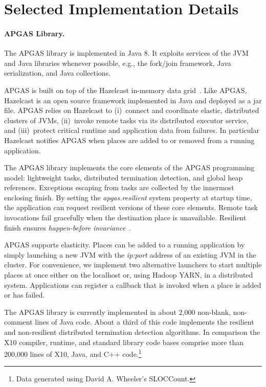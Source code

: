 \section{Selected Implementation Details}
\label{sec:serialization}

\paragraph{APGAS Library.}
The APGAS library is implemented in Java 8. It exploits services of the JVM and Java libraries whenever possible, e.g., the fork/join framework, Java serialization, and Java collections.

APGAS is built on top of the Hazelcast in-memory data grid~\cite{hazelcast}. Like APGAS, Hazelcast is an open source framework implemented in Java and deployed as a jar file. APGAS relies on Hazelcast to (i)~connect and coordinate elastic, distributed clusters of JVMs, (ii)~invoke remote tasks via its distributed executor service, and (iii)~protect critical runtime and application data from failures. In particular Hazelcast notifies APGAS when places are added to or removed from a running application.

The APGAS library implements the core elements of the APGAS programming model: lightweight tasks, distributed termination detection, and global heap references. Exceptions escaping from tasks are collected by the innermost enclosing finish.
By setting the \emph{apgas.resilient} system property at startup time, the application can request resilient versions of these core elements. Remote task invocations fail gracefully when the destination place is unavailable. Resilient finish ensures \emph{happen-before invariance}~\cite{ppopp14,ecoop14}.

APGAS supports elasticity. Places can be added to a running application by simply launching a new JVM with the \emph{ip:port} address of an existing JVM in the cluster. For convenience, we implement two alternative launchers to start multiple places at once either on the localhost or, using Hadoop YARN, in a distributed system.
Applications can register a callback that is invoked when a place is added or has failed.

The APGAS library is currently implemented in about 2,000 non-blank, non-comment lines of Java code. About a third of this code implements the resilient and non-resilient distributed termination detection algorithms. In comparison the X10 compiler, runtime, and standard library code bases comprise more than 200,000 lines of X10, Java, and C++ code.\footnote{Data generated using David A. Wheeler's SLOCCount.}


